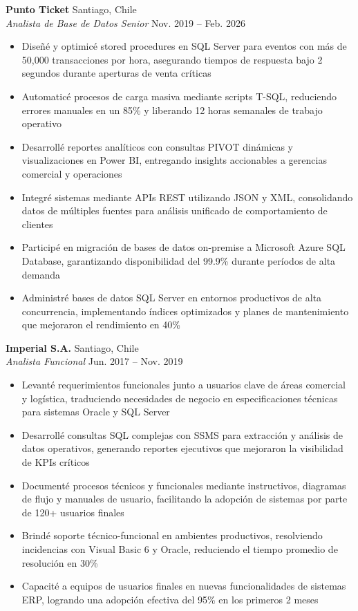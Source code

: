 \documentclass[11pt,letterpaper]{article}
\begin{document}
\textbf{Punto Ticket} \hfill Santiago, Chile\\
\textit{Analista de Base de Datos Senior} \hfill Nov. 2019 – Feb. 2026
\begin{itemize}
  \item Diseñé y optimicé stored procedures en SQL Server para eventos con más de 50,000 transacciones por hora, asegurando tiempos de respuesta bajo 2 segundos durante aperturas de venta críticas
  \item Automaticé procesos de carga masiva mediante scripts T-SQL, reduciendo errores manuales en un 85\% y liberando 12 horas semanales de trabajo operativo
  \item Desarrollé reportes analíticos con consultas PIVOT dinámicas y visualizaciones en Power BI, entregando insights accionables a gerencias comercial y operaciones
  \item Integré sistemas mediante APIs REST utilizando JSON y XML, consolidando datos de múltiples fuentes para análisis unificado de comportamiento de clientes
  \item Participé en migración de bases de datos on-premise a Microsoft Azure SQL Database, garantizando disponibilidad del 99.9\% durante períodos de alta demanda
  \item Administré bases de datos SQL Server en entornos productivos de alta concurrencia, implementando índices optimizados y planes de mantenimiento que mejoraron el rendimiento en 40\%
\end{itemize}
\vspace{2pt}
\textbf{Imperial S.A.} \hfill Santiago, Chile\\
\textit{Analista Funcional} \hfill Jun. 2017 – Nov. 2019
\begin{itemize}
  \item Levanté requerimientos funcionales junto a usuarios clave de áreas comercial y logística, traduciendo necesidades de negocio en especificaciones técnicas para sistemas Oracle y SQL Server
  \item Desarrollé consultas SQL complejas con SSMS para extracción y análisis de datos operativos, generando reportes ejecutivos que mejoraron la visibilidad de KPIs críticos
  \item Documenté procesos técnicos y funcionales mediante instructivos, diagramas de flujo y manuales de usuario, facilitando la adopción de sistemas por parte de 120+ usuarios finales
  \item Brindé soporte técnico-funcional en ambientes productivos, resolviendo incidencias con Visual Basic 6 y Oracle, reduciendo el tiempo promedio de resolución en 30\%
  \item Capacité a equipos de usuarios finales en nuevas funcionalidades de sistemas ERP, logrando una adopción efectiva del 95\% en los primeros 2 meses
\end{itemize}
\end{document}

